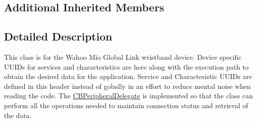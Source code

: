 \subsection*{Additional Inherited Members}


\subsection{Detailed Description}
This class is for the Wahoo Mio Global Link wristband device. Device specific U\-U\-I\-Ds for services and characteristics are here along with the execution path to obtain the desired data for the application. Service and Characteristic U\-U\-I\-Ds are defined in this header instead of gobally in an effort to reduce mental noise when reading the code. The \hyperlink{class_c_b_peripheral_delegate-p}{C\-B\-Peripheral\-Delegate} is implemented so that the class can perform all the operations needed to maintain connection status and retrieval of the data. 

